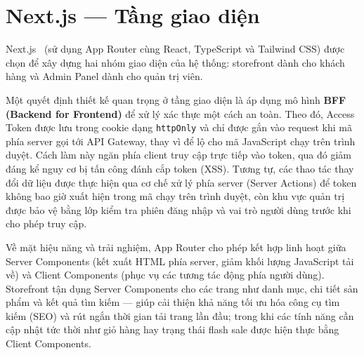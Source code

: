 \documentclass[../DoAn.tex]{subfiles}
\begin{document}


\section{Next.js --- Tầng giao diện}
\label{section:3.6}

Next.js~\cite{nextjs_docs} (sử dụng App Router cùng React, TypeScript và Tailwind CSS) được
chọn để xây dựng hai nhóm giao diện của hệ thống: storefront dành cho khách hàng và Admin
Panel dành cho quản trị viên.

Một quyết định thiết kế quan trọng ở tầng giao diện là áp dụng mô hình \textbf{BFF (Backend
for Frontend)} để xử lý xác thực một cách an toàn. Theo đó, Access Token được lưu trong
cookie dạng \texttt{httpOnly} và chỉ được gắn vào request khi mã phía server gọi tới API
Gateway, thay vì để lộ cho mã JavaScript chạy trên trình duyệt. Cách làm này ngăn phía client
truy cập trực tiếp vào token, qua đó giảm đáng kể nguy cơ bị tấn công đánh cắp token (XSS).
Tương tự, các thao tác thay đổi dữ liệu được thực hiện qua cơ chế xử lý phía server (Server
Actions) để token không bao giờ xuất hiện trong mã chạy trên trình duyệt, còn khu vực quản
trị được bảo vệ bằng lớp kiểm tra phiên đăng nhập và vai trò người dùng trước khi cho phép
truy cập.

Về mặt hiệu năng và trải nghiệm, App Router cho phép kết hợp linh hoạt giữa Server Components
(kết xuất HTML phía server, giảm khối lượng JavaScript tải về) và Client Components (phục vụ
các tương tác động phía người dùng). Storefront tận dụng Server Components cho các trang như
danh mục, chi tiết sản phẩm và kết quả tìm kiếm --- giúp cải thiện khả năng tối ưu hóa công
cụ tìm kiếm (SEO) và rút ngắn thời gian tải trang lần đầu; trong khi các tính năng cần cập
nhật tức thời như giỏ hàng hay trạng thái flash sale được hiện thực bằng Client Components.
\end{document}
